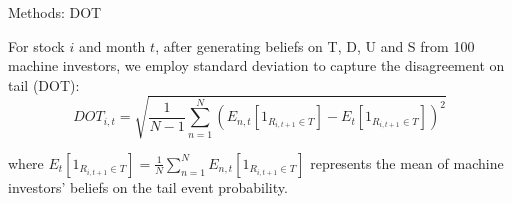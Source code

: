\documentclass[11pt, aspectratio=169]{beamer}
\newenvironment{wideitemize}{\itemize\addtolength{\itemsep}{10pt}}{\enditemize}
\begin{document}
\begin{frame}{Methods: DOT}
    \bigskip
    \begin{wideitemize}
    \item For stock $i$ and month $t$, after generating beliefs on T, D, U and S from 100 machine investors, we employ standard deviation to capture the \alert{disagreement on tail (DOT)}:
    \begin{equation*}
        DOT_{i,t}=\sqrt{\frac{1}{N-1}\sum_{n=1}^{N}\left(E_{n,t}[1_{R_{i,t+1}\in T}]-E_t[1_{R_{i,t+1}\in T}]\right)^{2}}
    \end{equation*}
       
    where $E_t[1_{R_{i,t+1}\in T}] = \frac{1}{N}\sum_{n=1}^{N}E_{n,t}[1_{R_{i,t+1}\in T}]$ represents the mean of machine investors' beliefs on the tail event probability.
   
    \end{wideitemize}
\end{frame}



\end{document}
